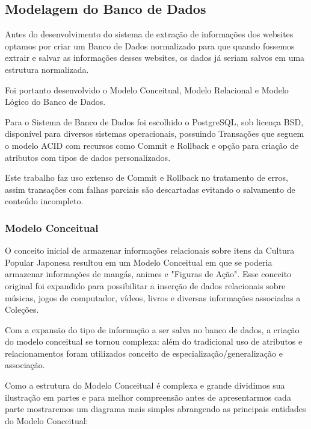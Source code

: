\documentclass[12pt]{article}
\begin{document}
\subsection{Modelagem do Banco de Dados}

Antes do desenvolvimento do sistema de extração de informações dos websites optamos por criar um Banco de Dados normalizado para que quando fossemos extrair e salvar as informações desses websites, os dados já seriam salvos em uma estrutura normalizada.

Foi portanto desenvolvido o Modelo Conceitual, Modelo Relacional e Modelo Lógico do Banco de Dados.

Para o Sistema de Banco de Dados foi escolhido o PostgreSQL, sob licença BSD, disponível para diversos sistemas operacionais, possuindo Transações que seguem o modelo ACID com recursos como Commit e Rollback e opção para criação de atributos com tipos de dados personalizados. 

Este trabalho faz uso extenso de Commit e Rollback no tratamento de erros, assim transações com falhas parciais são descartadas evitando o salvamento de conteúdo incompleto.


\subsubsection{Modelo Conceitual}

O conceito inicial de armazenar informações relacionais sobre itens da Cultura Popular Japonesa resultou em um Modelo Conceitual em que se poderia armazenar informações de mangás, animes e "Figuras de Ação". Esse conceito original foi expandido para possibilitar a inserção de dados relacionais sobre músicas, jogos de computador, vídeos, livros e diversas informações associadas a Coleções. 

Com a expansão do tipo de informação a ser salva no banco de dados, a criação do modelo conceitual se tornou complexa: além do tradicional uso de atributos e relacionamentos foram utilizados conceito de especialização/generalização e associação. 

Como a estrutura do Modelo Conceitual é complexa e grande dividimos sua ilustração em partes e para melhor compreensão antes de apresentarmos cada parte mostraremos um diagrama mais simples abrangendo as principais entidades do Modelo Conceitual:
\end{document}

